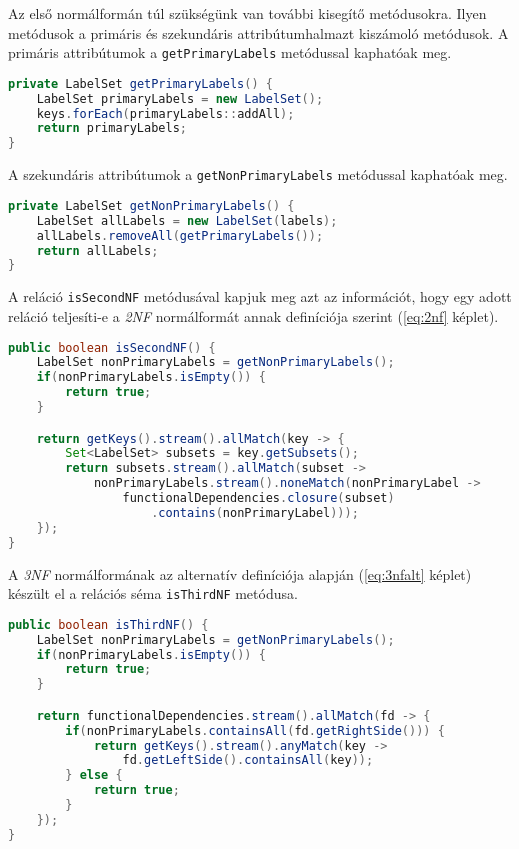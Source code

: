 Az első normálformán túl szükségünk van további kisegítő metódusokra. Ilyen metódusok a primáris és szekundáris attribútumhalmazt kiszámoló metódusok. A primáris attribútumok a \lstinline{getPrimaryLabels} metódussal kaphatóak meg.

\linespread{1}
\begin{lstlisting}[language=Java]
private LabelSet getPrimaryLabels() {
	LabelSet primaryLabels = new LabelSet();
	keys.forEach(primaryLabels::addAll);
	return primaryLabels;
}
\end{lstlisting}

A szekundáris attribútumok a \lstinline{getNonPrimaryLabels} metódussal kaphatóak meg.

\linespread{1}
\begin{lstlisting}[language=Java]
private LabelSet getNonPrimaryLabels() {
	LabelSet allLabels = new LabelSet(labels);
	allLabels.removeAll(getPrimaryLabels());
	return allLabels;
}
\end{lstlisting}

A reláció \lstinline{isSecondNF} metódusával kapjuk meg azt az információt, hogy egy adott reláció teljesíti-e a \textit{2NF} normálformát annak definíciója szerint (\ref{eq:2nf} képlet).

\linespread{1}
\begin{lstlisting}[language=Java]
public boolean isSecondNF() {
    LabelSet nonPrimaryLabels = getNonPrimaryLabels();
    if(nonPrimaryLabels.isEmpty()) {
        return true;
    }

    return getKeys().stream().allMatch(key -> {
        Set<LabelSet> subsets = key.getSubsets();
        return subsets.stream().allMatch(subset -> 
            nonPrimaryLabels.stream().noneMatch(nonPrimaryLabel ->
                functionalDependencies.closure(subset)
                    .contains(nonPrimaryLabel)));
    });
}
\end{lstlisting}

A \textit{3NF} normálformának az alternatív definíciója alapján (\ref{eq:3nfalt} képlet) készült el a relációs séma \lstinline{isThirdNF} metódusa.

\linespread{1}
\begin{lstlisting}[language=Java]
public boolean isThirdNF() {
	LabelSet nonPrimaryLabels = getNonPrimaryLabels();
	if(nonPrimaryLabels.isEmpty()) {
		return true;
	}

	return functionalDependencies.stream().allMatch(fd -> {
		if(nonPrimaryLabels.containsAll(fd.getRightSide())) {
			return getKeys().stream().anyMatch(key -> 
				fd.getLeftSide().containsAll(key));
		} else {
			return true;
		}
	});
}
\end{lstlisting}

